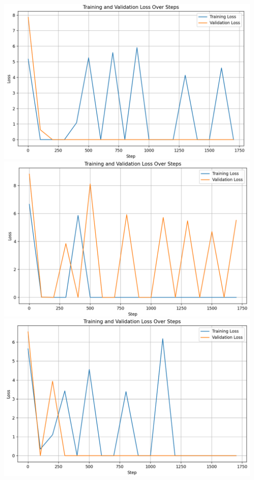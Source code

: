 \documentclass[10pt,twocolumn,letterpaper]{article}
\begin{document}
\begin{center}
\includegraphics*[scale=0.30]{img/cv1.png}
\includegraphics*[scale=0.30]{img/cv2.png}
\includegraphics*[scale=0.30]{img/cv3.png}
\end{center} 
\end{document}
